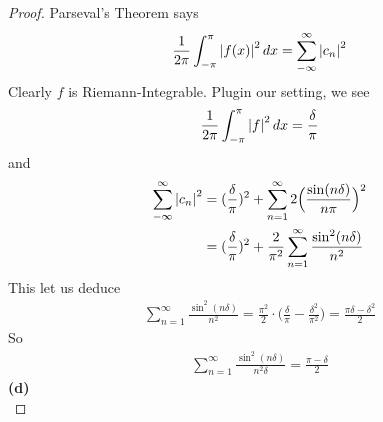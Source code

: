 \documentclass{report}
\begin{document}
\begin{proof}
Parseval's Theorem says 
\begin{align*}
\frac{1}{2\pi}\int_{-\pi}^{\pi}\left|f(x)\right|^2dx=\sum_{-\infty}^\infty \left|c_n\right|^2
\end{align*}
Clearly $f$ is Riemann-Integrable. Plugin our setting, we see 
\begin{align*}
\frac{1}{2\pi}\int_{-\pi}^\pi\left|f\right|^2dx= \frac{\delta}{\pi}
\end{align*}
and
\begin{align*}
\sum_{-\infty}^\infty \left|c_n\right|^2&=(\frac{\delta}{\pi})^2+ \sum_{n=1}^\infty 2\Big( \frac{\sin (n\delta)}{n \pi }\Big)^2\\
&=(\frac{\delta}{\pi})^2 + \frac{2}{\pi^2}\sum_{n=1}^\infty \frac{\sin^2 (n\delta)}{n^2} 
\end{align*}
This let us deduce 
\begin{align*}
\sum_{n=1}^\infty \frac{\sin ^2 (n\delta)}{n^2}=\frac{\pi^2}{2}\cdot \big(\frac{\delta}{\pi}-\frac{\delta^2}{\pi^2} \big)=\frac{\pi \delta -\delta^2}{2}
\end{align*}
So 
\begin{align*}
\sum_{n=1}^\infty \frac{\sin^2(n\delta)}{n^2 \delta}=\frac{\pi -\delta}{2}
\end{align*}
\textbf{(d)}\\


\end{proof}
\end{document}
